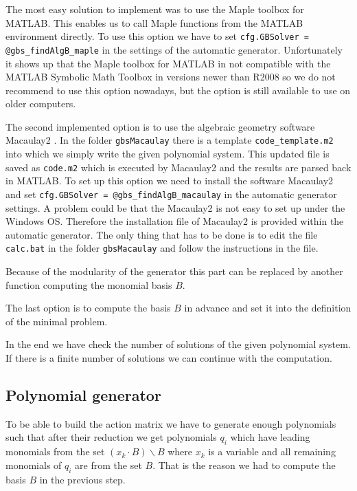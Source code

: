 The most easy solution to implement was to use the Maple toolbox for MATLAB. This enables us to call Maple functions from the MATLAB environment directly. To use this option we have to set \texttt{cfg.GBSolver = @gbs\_findAlgB\_maple} in the settings of the automatic generator. Unfortunately it shows up that the Maple toolbox for MATLAB in not compatible with the MATLAB Symbolic Math Toolbox in versions newer than R2008 so we do not recommend to use this option nowadays, but the option is still available to use on older computers.

The second implemented option is to use the algebraic geometry software Macaulay2 \cite{M2}. In the folder \texttt{gbsMacaulay} there is a template \texttt{code\_template.m2} into which we simply write the given polynomial system. This updated file is saved as \texttt{code.m2} which is executed by Macaulay2 and the results are parsed back in MATLAB. To set up this option we need to install the software Macaulay2 and set \texttt{cfg.GBSolver = @gbs\_findAlgB\_macaulay} in the automatic generator settings. A problem could be that the Macaulay2 is not easy to set up under the Windows OS. Therefore the installation file of Macaulay2 is provided within the automatic generator. The only thing that has to be done is to edit the file \texttt{calc.bat} in the folder \texttt{gbsMacaulay} and follow the instructions in the file.

Because of the modularity of the generator this part can be replaced by another function computing the monomial basis $B$.

The last option is to compute the basis $B$ in advance and set it into the definition of the minimal problem.

In the end we have check the number of solutions of the given polynomial system. If there is a finite number of solutions we can continue with the computation.

\subsection{Polynomial generator}
\label{subsec:polynomialGenerator}
To be able to build the action matrix we have to generate enough polynomials such that after their reduction we get polynomials $q_i$ which have leading monomials from the set $\left(x_k \cdot B\right)\backslash B$ where $x_k$ is a variable and all remaining monomials of $q_i$ are from the set $B$. That is the reason we had to compute the basis $B$ in the previous step.

